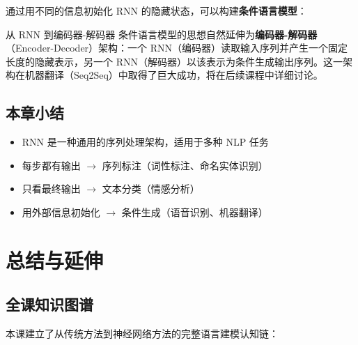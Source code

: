\documentclass[a4paper]{article}
\begin{document}
通过用不同的信息初始化 RNN 的隐藏状态，可以构建\textbf{条件语言模型}：





\begin{knowledgebox}{从 RNN 到编码器-解码器}
条件语言模型的思想自然延伸为\textbf{编码器-解码器}（Encoder-Decoder）架构：一个 RNN（编码器）读取输入序列并产生一个固定长度的隐藏表示，另一个 RNN（解码器）以该表示为条件生成输出序列。这一架构在机器翻译（Seq2Seq）中取得了巨大成功，将在后续课程中详细讨论。
\end{knowledgebox}

\subsection{本章小结}

\begin{itemize}
    \item RNN 是一种通用的序列处理架构，适用于多种 NLP 任务
    \item 每步都有输出 $\rightarrow$ 序列标注（词性标注、命名实体识别）
    \item 只看最终输出 $\rightarrow$ 文本分类（情感分析）
    \item 用外部信息初始化 $\rightarrow$ 条件生成（语音识别、机器翻译）
\end{itemize}


\section{总结与延伸}

\subsection{全课知识图谱}

本课建立了从传统方法到神经网络方法的完整语言建模认知链：
\end{document}
